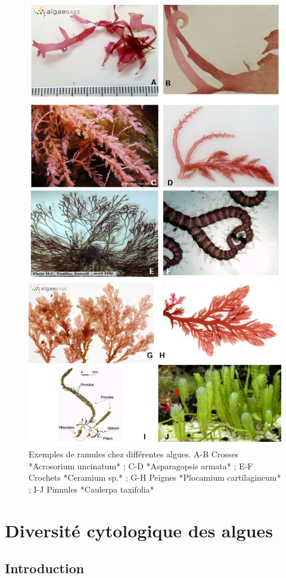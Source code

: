 \documentclass[
]{book}
\begin{document}
\begin{figure}[H]

{\centering \includegraphics[width=0.7\linewidth]{./images/ramules} 

}

\caption{Exemples de ramules chez différentes algues. A-B Crosses *Acrosorium uncinatum* ; C-D *Asparagopsis armata* ; E-F Crochets *Ceramium sp.* ; G-H Peignes *Plocamium cartilagineum* ; I-J Pinnules *Caulerpa taxifolia*}\label{fig:ramule}
\end{figure}

\hypertarget{cytologie}{%
\chapter{Diversité cytologique des algues}\label{cytologie}}

\hypertarget{introduction}{%
\section{Introduction}\label{introduction}}
\end{document}
